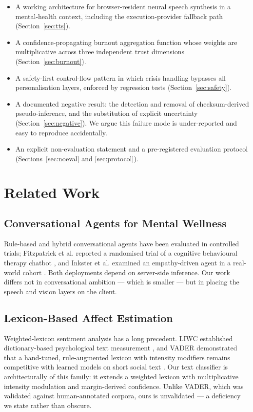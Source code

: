 \documentclass[conference]{IEEEtran}
\begin{document}
\begin{itemize}
\item A working architecture for browser-resident neural speech synthesis in a
mental-health context, including the execution-provider fallback path
(Section~\ref{sec:tts}).
\item A confidence-propagating burnout aggregation function whose weights are
multiplicative across three independent trust dimensions
(Section~\ref{sec:burnout}).
\item A safety-first control-flow pattern in which crisis handling bypasses all
personalisation layers, enforced by regression tests
(Section~\ref{sec:safety}).
\item A documented negative result: the detection and removal of
checksum-derived pseudo-inference, and the substitution of explicit
uncertainty (Section~\ref{sec:negative}). We argue this failure mode is
under-reported and easy to reproduce accidentally.
\item An explicit non-evaluation statement and a pre-registered evaluation
protocol (Sections~\ref{sec:noeval} and \ref{sec:protocol}).
\end{itemize}

\section{Related Work}

\subsection{Conversational Agents for Mental Wellness}
Rule-based and hybrid conversational agents have been evaluated in controlled
trials; Fitzpatrick et al. reported a randomised trial of a cognitive
behavioural therapy chatbot \cite{woebot}, and Inkster et al. examined an
empathy-driven agent in a real-world cohort \cite{wysa}. Both deployments
depend on server-side inference. Our work differs not in conversational
ambition --- which is smaller --- but in placing the speech and vision layers
on the client.

\subsection{Lexicon-Based Affect Estimation}
Weighted-lexicon sentiment analysis has a long precedent. LIWC established
dictionary-based psychological text measurement \cite{liwc}, and VADER
demonstrated that a hand-tuned, rule-augmented lexicon with intensity
modifiers remains competitive with learned models on short social text
\cite{vader}. Our text classifier is architecturally of this family: it extends
a weighted lexicon with multiplicative intensity modulation and margin-derived
confidence. Unlike VADER, which was validated against human-annotated
corpora, ours is unvalidated --- a deficiency we state rather than obscure.
\end{document}

